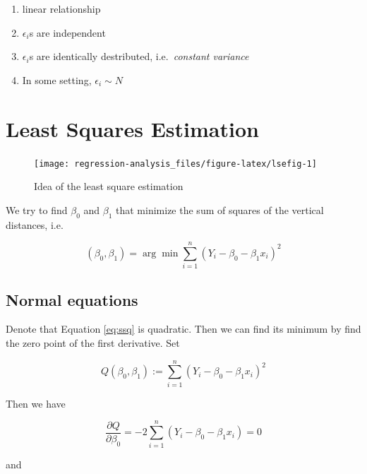 \documentclass[]{book}
\providecommand{\tightlist}{%
  \setlength{\itemsep}{0pt}\setlength{\parskip}{0pt}}
\theoremstyle{definition}
\theoremstyle{definition}
\theoremstyle{definition}
\theoremstyle{remark}
\begin{document}
\begin{enumerate}
\def\labelenumi{\arabic{enumi}.}
\tightlist
\item
  linear relationship
\item
  \(\epsilon_i\)s are independent
\item
  \(\epsilon_i\)s are identically destributed, i.e.~\emph{constant variance}
\item
  In some setting, \(\epsilon_i \sim N\)
\end{enumerate}

\hypertarget{least-squares-estimation}{%
\section{Least Squares Estimation}\label{least-squares-estimation}}

\begin{figure}[H]

{\centering \texttt{[image: regression-analysis\_files/figure-latex/lsefig-1]} 

}

\caption{Idea of the least square estimation}\label{fig:lsefig}
\end{figure}

We try to find \(\beta_0\) and \(\beta_1\) that minimize the sum of squares of the vertical distances, i.e.

\begin{equation}
  (\beta_0, \beta_1) = \arg\min \sum_{i = 1}^n (Y_i - \beta_0 - \beta_1 x_i)^2
  \label{eq:ssq}
\end{equation}

\hypertarget{normal-equations}{%
\subsection{Normal equations}\label{normal-equations}}

Denote that Equation \eqref{eq:ssq} is quadratic. Then we can find its minimum by find the zero point of the first derivative. Set

\[Q(\beta_0, \beta_1) := \sum_{i = 1}^n (Y_i - \beta_0 - \beta_1 x_i)^2\]

Then we have

\begin{equation}
  \frac{\partial Q}{\partial \beta_0} = -2 \sum_{i = 1}^n(Y_i - \beta_0 - \beta_1 x_i) = 0
  \label{eq:normbeta0}
\end{equation}

and
\end{document}
